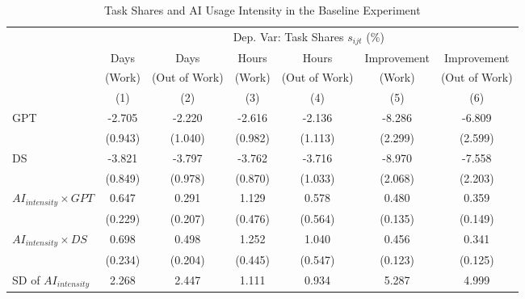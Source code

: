 \begin{table}[H]
\centering
\caption{Task Shares and AI Usage Intensity in the Baseline Experiment}
\footnotesize
\begin{threeparttable}
\begin{tabular}{l*{6}{c}}
\toprule\toprule
& \multicolumn{6}{c}{Dep. Var: Task Shares $s_{ijt}$ (\%)} \\
\cmidrule(lr){2-7}
& Days & Days & Hours & Hours & Improvement & Improvement \\
& (Work) & (Out of Work) & (Work) & (Out of Work) & (Work) & (Out of Work) \\
            &\multicolumn{1}{c}{(1)}         &\multicolumn{1}{c}{(2)}         &\multicolumn{1}{c}{(3)}         &\multicolumn{1}{c}{(4)}         &\multicolumn{1}{c}{(5)}         &\multicolumn{1}{c}{(6)}         \\
\midrule
GPT         &      -2.705\sym{***}&      -2.220\sym{**} &      -2.616\sym{***}&      -2.136\sym{*}  &      -8.286\sym{***}&      -6.809\sym{***}\\
            &     (0.943)         &     (1.040)         &     (0.982)         &     (1.113)         &     (2.299)         &     (2.599)         \\
\addlinespace
DS          &      -3.821\sym{***}&      -3.797\sym{***}&      -3.762\sym{***}&      -3.716\sym{***}&      -8.970\sym{***}&      -7.558\sym{***}\\
            &     (0.849)         &     (0.978)         &     (0.870)         &     (1.033)         &     (2.068)         &     (2.203)         \\
\addlinespace
$AI_{intensity} \times GPT$&       0.647\sym{***}&       0.291         &       1.129\sym{**} &       0.578         &       0.480\sym{***}&       0.359\sym{**} \\
            &     (0.229)         &     (0.207)         &     (0.476)         &     (0.564)         &     (0.135)         &     (0.149)         \\
\addlinespace
$AI_{intensity} \times DS$&       0.698\sym{***}&       0.498\sym{**} &       1.252\sym{***}&       1.040\sym{*}  &       0.456\sym{***}&       0.341\sym{***}\\
            &     (0.234)         &     (0.204)         &     (0.445)         &     (0.547)         &     (0.123)         &     (0.125)         \\
\midrule
SD of $AI_{intensity}$&       2.268         &       2.447         &       1.111         &       0.934         &       5.287         &       4.999         \\

\end{tabular}
\end{threeparttable}
\end{table}
